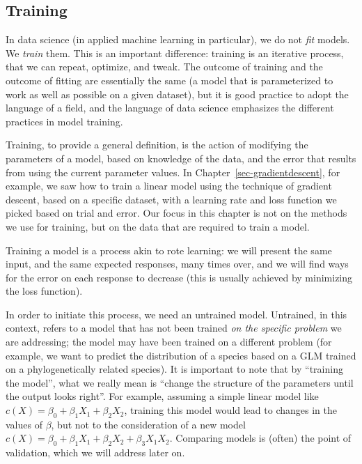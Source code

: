 \documentclass[
  letterpaper,
]{scrbook}
\begin{document}
\subsection{Training}\label{training}

In data science (in applied machine learning in particular), we do not
\emph{fit} models. We \emph{train} them. This is an important
difference: training is an iterative process, that we can repeat,
optimize, and tweak. The outcome of training and the outcome of fitting
are essentially the same (a model that is parameterized to work as well
as possible on a given dataset), but it is good practice to adopt the
language of a field, and the language of data science emphasizes the
different practices in model training.

Training, to provide a general definition, is the action of modifying
the parameters of a model, based on knowledge of the data, and the error
that results from using the current parameter values. In
Chapter~\ref{sec-gradientdescent}, for example, we saw how to train a
linear model using the technique of gradient descent, based on a
specific dataset, with a learning rate and loss function we picked based
on trial and error. Our focus in this chapter is not on the methods we
use for training, but on the data that are required to train a model.

Training a model is a process akin to rote learning: we will present the
same input, and the same expected responses, many times over, and we
will find ways for the error on each response to decrease (this is
usually achieved by minimizing the loss function).

In order to initiate this process, we need an untrained model.
Untrained, in this context, refers to a model that has not been trained
\emph{on the specific problem} we are addressing; the model may have
been trained on a different problem (for example, we want to predict the
distribution of a species based on a GLM trained on a phylogenetically
related species). It is important to note that by ``training the
model'', what we really mean is ``change the structure of the parameters
until the output looks right''. For example, assuming a simple linear
model like \(c(X) = \beta_0 + \beta_1X_1 + \beta_2X_2\), training this
model would lead to changes in the values of \(\beta\), but not to the
consideration of a new model
\(c(X) = \beta_0 + \beta_1X_1 + \beta_2X_2 + \beta_3X_1X_2\). Comparing
models is (often) the point of validation, which we will address later
on.
\end{document}
